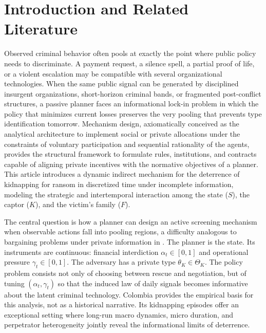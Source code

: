 \documentclass[ecta,nameyear,draft]{econsocart}
\theoremstyle{plain}
\theoremstyle{definition}
\newcommand{\ThetaK}{\Theta_K}
\newcommand{\1}{\mathbf{1}}
\begin{document}
\begin{frontmatter}
\begin{keyword}
\end{keyword}

\begin{keyword}[class=JEL]
\end{keyword}

\end{frontmatter}

\section{Introduction and Related Literature}\label{sec:intro}

Observed criminal behavior often pools at exactly the point where public policy needs to discriminate. A payment request, a silence spell, a partial proof of life, or a violent escalation may be compatible with several organizational technologies. When the same public signal can be generated by disciplined insurgent organizations, short-horizon criminal bands, or fragmented post-conflict structures, a passive planner faces an informational lock-in problem in which the policy that minimizes current losses preserves the very pooling that prevents type identification tomorrow. Mechanism design, axiomatically conceived as the analytical architecture to implement social or private allocations under the constraints of voluntary participation and sequential rationality of the agents, provides the structural framework to formulate rules, institutions, and contracts capable of aligning private incentives with the normative objectives of a planner. This article introduces a dynamic indirect mechanism for the deterrence of kidnapping for ransom in discretized time under incomplete information, modeling the strategic and intertemporal interaction among the state ($S$), the captor ($K$), and the victim's family ($F$).

The central question is how a planner can design an active screening mechanism when observable actions fall into pooling regions, a difficulty analogous to bargaining problems under private information in \citet{Fearon1995Rationalist}. The planner is the state. Its instruments are continuous: financial interdiction $\alpha_t\in[0,1]$ and operational pressure $\gamma_t\in[0,1]$. The adversary has a private type $\theta_K\in\ThetaK$. The policy problem consists not only of choosing between rescue and negotiation, but of tuning $(\alpha_t,\gamma_t)$ so that the induced law of daily signals becomes informative about the latent criminal technology. Colombia provides the empirical basis for this analysis, not as a historical narrative. Its kidnapping episodes offer an exceptional setting where long-run macro dynamics, micro duration, and perpetrator heterogeneity jointly reveal the informational limits of deterrence.
\end{document}
